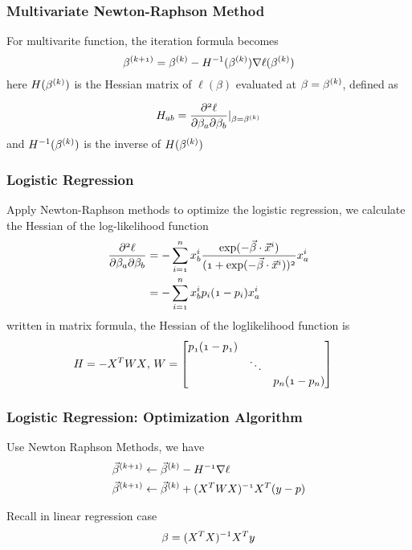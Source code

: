 \documentclass[notheorems, aspectratio=54]{beamer}
\begin{document}
\begin{frame}
\frametitle{Multivariate Newton-Raphson Method }
For multivarite function, the iteration formula becomes
$$
\mathnormal{\beta^{(k+1)}}=\mathnormal{\beta^{(k)}}-\mathnormal{H}^{-1}\mathnormal{(\beta^{(k)})\nabla \ell(\beta^{(k)})}
$$
here $\mathnormal{H(\beta^{(k)})}$ is the Hessian matrix of $\ell(\beta)$ evaluated at $\mathnormal{\beta=\beta^{(k)}}$, defined as

$$
\mathnormal{H_{ab}}=\mathnormal{\frac{\partial^2\ell}{\partial\beta_a\partial\beta_b}|_{\beta=\beta^{(k)}}}
$$
and $\mathnormal{H}^{-1}\mathnormal{(\beta^{(k)})}$ is the inverse of $\mathnormal{H(\beta^{(k)})}$

\end{frame}

\begin{frame}

\frametitle{Logistic Regression}
Apply Newton-Raphson methods to optimize the logistic regression, we calculate the Hessian of the log-likelihood function
\begin{align*}
\mathnormal{\frac{\partial^2\ell}{\partial\beta_a\partial\beta_b}}
&=\mathnormal{-\sum_{i=1}^{n}x_b^i\frac{\exp(-\vec{\beta}\cdot\vec{x}^i)}{(1+\exp(-\vec{\beta}\cdot\vec{x}^i))^2}x_a^i}\\
&=\mathnormal{-\sum_{i=1}^{n}x_b^i p_i (1-p_i)x_a^i}\\
\end{align*}
written in matrix formula, the Hessian of the loglikelihood function is
\begin{align*}
\mathnormal{{H}}&=\mathnormal{-X^TWX}\text{, } 
\mathnormal{W}=  \begin{bmatrix}
    \mathnormal{p_1 (1-p_1)} & & \\
    & \ddots & \\
    & & \mathnormal{p_n (1-p_n)}
  \end{bmatrix}
\end{align*}
\end{frame}

\begin{frame}
\frametitle{Logistic Regression: Optimization Algorithm}
Use Newton Raphson Methods, we have
\begin{align*}
\mathnormal{\vec{\beta}^{(k+1)}} &\leftarrow \mathnormal{\vec{\beta}^{(k)}-{H}^{-1}\nabla\ell}\\
\mathnormal{\vec{\beta}^{(k+1)}} &\leftarrow \mathnormal{\vec{\beta}^{(k)}+({X}^T{W}{X})^{-1}{X}^T({y}-{p})}
\end{align*}

Recall in linear regression case
$$
\beta=(\mathnormal{X^T}\mathnormal{X})^{-1}\mathnormal{X^{T}}\mathnormal{y}
$$
\end{frame}
\end{document}
